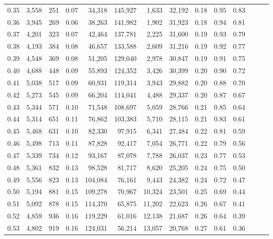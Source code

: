 \begin{tabular}{rrrrrrrrrrrrrr}
0.35 &  3,558 &  251 &  0.07 &   34,318 &  145,927 &   1,633 &  32,192 &  0.18 &  0.95 &      0.83 \\
0.36 &  3,945 &  269 &  0.06 &   38,263 &  141,982 &   1,902 &  31,923 &  0.18 &  0.94 &      0.81 \\
0.37 &  4,201 &  323 &  0.07 &   42,464 &  137,781 &   2,225 &  31,600 &  0.19 &  0.93 &      0.79 \\
0.38 &  4,193 &  384 &  0.08 &   46,657 &  133,588 &   2,609 &  31,216 &  0.19 &  0.92 &      0.77 \\
0.39 &  4,548 &  369 &  0.08 &   51,205 &  129,040 &   2,978 &  30,847 &  0.19 &  0.91 &      0.75 \\
0.40 &  4,688 &  448 &  0.09 &   55,893 &  124,352 &   3,426 &  30,399 &  0.20 &  0.90 &      0.72 \\
0.41 &  5,038 &  517 &  0.09 &   60,931 &  119,314 &   3,943 &  29,882 &  0.20 &  0.88 &      0.70 \\
0.42 &  5,273 &  545 &  0.09 &   66,204 &  114,041 &   4,488 &  29,337 &  0.20 &  0.87 &      0.67 \\
0.43 &  5,344 &  571 &  0.10 &   71,548 &  108,697 &   5,059 &  28,766 &  0.21 &  0.85 &      0.64 \\
0.44 &  5,314 &  651 &  0.11 &   76,862 &  103,383 &   5,710 &  28,115 &  0.21 &  0.83 &      0.61 \\
0.45 &  5,468 &  631 &  0.10 &   82,330 &   97,915 &   6,341 &  27,484 &  0.22 &  0.81 &      0.59 \\
0.46 &  5,498 &  713 &  0.11 &   87,828 &   92,417 &   7,054 &  26,771 &  0.22 &  0.79 &      0.56 \\
0.47 &  5,339 &  734 &  0.12 &   93,167 &   87,078 &   7,788 &  26,037 &  0.23 &  0.77 &      0.53 \\
0.48 &  5,361 &  832 &  0.13 &   98,528 &   81,717 &   8,620 &  25,205 &  0.24 &  0.75 &      0.50 \\
0.49 &  5,556 &  823 &  0.13 &  104,084 &   76,161 &   9,443 &  24,382 &  0.24 &  0.72 &      0.47 \\
0.50 &  5,194 &  881 &  0.15 &  109,278 &   70,967 &  10,324 &  23,501 &  0.25 &  0.69 &      0.44 \\
0.51 &  5,092 &  878 &  0.15 &  114,370 &   65,875 &  11,202 &  22,623 &  0.26 &  0.67 &      0.41 \\
0.52 &  4,859 &  936 &  0.16 &  119,229 &   61,016 &  12,138 &  21,687 &  0.26 &  0.64 &      0.39 \\
0.53 &  4,802 &  919 &  0.16 &  124,031 &   56,214 &  13,057 &  20,768 &  0.27 &  0.61 &      0.36 \\

\end{tabular}
